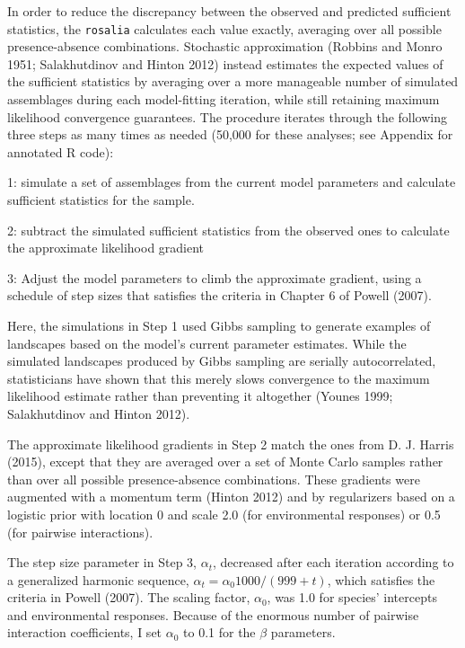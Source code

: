 In order to reduce the discrepancy between the observed and predicted
sufficient statistics, the \texttt{rosalia} calculates each value
exactly, averaging over all possible presence-absence combinations.
Stochastic approximation (Robbins and Monro 1951; Salakhutdinov and
Hinton 2012) instead estimates the expected values of the sufficient
statistics by averaging over a more manageable number of simulated
assemblages during each model-fitting iteration, while still retaining
maximum likelihood convergence guarantees. The procedure iterates
through the following three steps as many times as needed (50,000 for
these analyses; see Appendix for annotated R code):

1: simulate a set of assemblages from the current model parameters and
calculate sufficient statistics for the sample.

2: subtract the simulated sufficient statistics from the observed ones
to calculate the approximate likelihood gradient

3: Adjust the model parameters to climb the approximate gradient, using
a schedule of step sizes that satisfies the criteria in Chapter 6 of
Powell (2007).

Here, the simulations in Step 1 used Gibbs sampling to generate examples
of landscapes based on the model's current parameter estimates. While
the simulated landscapes produced by Gibbs sampling are serially
autocorrelated, statisticians have shown that this merely slows
convergence to the maximum likelihood estimate rather than preventing it
altogether (Younes 1999; Salakhutdinov and Hinton 2012).

The approximate likelihood gradients in Step 2 match the ones from D. J.
Harris (2015), except that they are averaged over a set of Monte Carlo
samples rather than over all possible presence-absence combinations.
These gradients were augmented with a momentum term (Hinton 2012) and by
regularizers based on a logistic prior with location 0 and scale 2.0
(for environmental responses) or 0.5 (for pairwise interactions).

The step size parameter in Step 3, \(\alpha_t\), decreased after each
iteration according to a generalized harmonic sequence,
\(\alpha_t = \alpha_0 1000/(999 + t)\), which satisfies the criteria in
Powell (2007). The scaling factor, \(\alpha_0\), was 1.0 for species'
intercepts and environmental responses. Because of the enormous number
of pairwise interaction coefficients, I set \(\alpha_0\) to 0.1 for the
\(\beta\) parameters.

